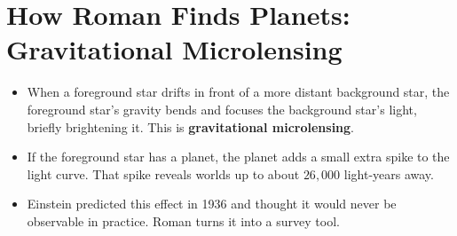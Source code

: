 \documentclass[11pt]{article}
\begin{document}
\section{How Roman Finds Planets: Gravitational Microlensing}

\begin{itemize}
\item When a foreground star drifts in front of a more distant background star, the
foreground star's gravity bends and focuses the background star's light, briefly
brightening it. This is \textbf{gravitational microlensing}.
\item If the foreground star has a planet, the planet adds a small extra spike to the
light curve. That spike reveals worlds up to about $26{,}000$ light-years away.
\item Einstein predicted this effect in 1936 and thought it would never be observable
in practice. Roman turns it into a survey tool.
\end{itemize}
\end{document}
